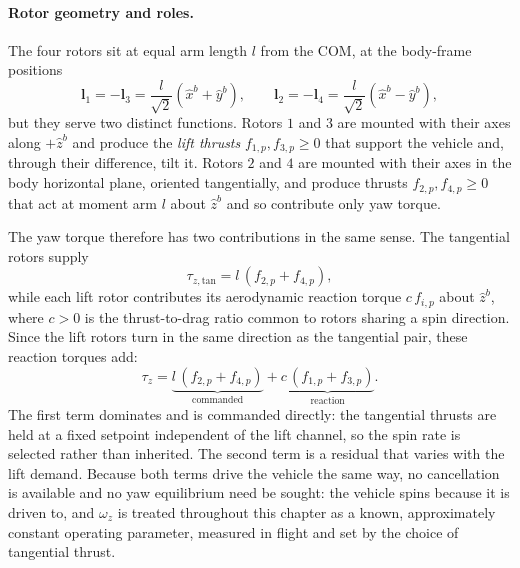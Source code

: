 \paragraph{Rotor geometry and roles.}
The four rotors sit at equal arm length $l$ from the COM, at the body-frame
positions
\begin{equation}
    \boldsymbol{l}_1 = -\boldsymbol{l}_3
        = \frac{l}{\sqrt{2}}\!\left(\hat{x}^b + \hat{y}^b\right),
    \qquad
    \boldsymbol{l}_2 = -\boldsymbol{l}_4
        = \frac{l}{\sqrt{2}}\!\left(\hat{x}^b - \hat{y}^b\right),
    \label{eq:prop_locs}
\end{equation}
but they serve two distinct functions.  Rotors $1$ and $3$ are mounted with
their axes along $+\hat{z}^b$ and produce the \emph{lift thrusts}
$f_{1,p}, f_{3,p} \geq 0$ that support the vehicle and, through their
difference, tilt it.  Rotors $2$ and $4$ are mounted with their axes in the
body horizontal plane, oriented tangentially, and produce thrusts
$f_{2,p}, f_{4,p} \geq 0$ that act at moment arm $l$ about $\hat{z}^b$ and so
contribute only yaw torque.

The yaw torque therefore has two contributions in the same sense.  The
tangential rotors supply
\begin{equation}
    \tau_{z,\mathrm{tan}} = l\,(f_{2,p} + f_{4,p}),
    \label{eq:yaw_tangential}
\end{equation}
while each lift rotor contributes its aerodynamic reaction torque
$c\,f_{i,p}$ about $\hat{z}^b$, where $c > 0$ is the thrust-to-drag ratio
common to rotors sharing a spin direction.  Since the lift rotors turn in the
same direction as the tangential pair, these reaction torques add:
\begin{equation}
    \tau_z = \underbrace{l\,(f_{2,p} + f_{4,p})}_{\text{commanded}}
             + \underbrace{c\,(f_{1,p} + f_{3,p})}_{\text{reaction}}.
    \label{eq:yaw_torque}
\end{equation}
The first term dominates and is commanded directly: the tangential thrusts are
held at a fixed setpoint independent of the lift channel, so the spin rate is
selected rather than inherited.  The second term is a residual that varies
with the lift demand.  Because both terms drive the vehicle the same way, no
cancellation is available and no yaw equilibrium need be sought: the vehicle
spins because it is driven to, and $\omega_z$ is treated throughout this
chapter as a known, approximately constant operating parameter, measured in
flight and set by the choice of tangential thrust.

